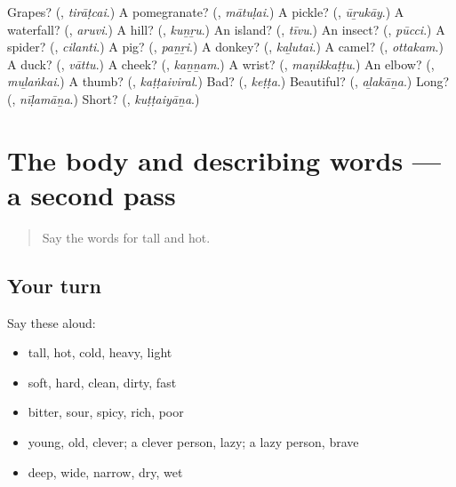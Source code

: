 \begin{tcolorbox}[breakable,colback=teal!4,colframe=teal!35!black,title={Before you move on}]
Grapes? (\textbf{}, \emph{tirāṭcai}.) A pomegranate? (\textbf{}, \emph{mātuḷai}.) A pickle? (\textbf{}, \emph{ūṟukāy}.) A waterfall? (\textbf{}, \emph{aruvi}.) A hill? (\textbf{}, \emph{kuṉṟu}.) An island? (\textbf{}, \emph{tīvu}.) An insect? (\textbf{}, \emph{pūcci}.) A spider? (\textbf{}, \emph{cilanti}.) A pig? (\textbf{}, \emph{paṉṟi}.) A donkey? (\textbf{}, \emph{kaḻutai}.) A camel? (\textbf{}, \emph{ottakam}.) A duck? (\textbf{}, \emph{vāttu}.) A cheek? (\textbf{}, \emph{kaṉṉam}.) A wrist? (\textbf{}, \emph{maṇikkaṭṭu}.) An elbow? (\textbf{}, \emph{muḻaṅkai}.) A thumb? (\textbf{}, \emph{kaṭṭaiviral}.) Bad? (\textbf{}, \emph{keṭṭa}.) Beautiful? (\textbf{}, \emph{aḻakāṉa}.) Long? (\textbf{}, \emph{nīḷamāṉa}.) Short? (\textbf{}, \emph{kuṭṭaiyāṉa}.)
\end{tcolorbox}
\section[(dialogue)]{The body and describing words — a second pass}

\label{lesson:TA-R148-second-pass-the-body-and-describing-words}



\begin{quote}
Say the words for tall and hot.
\end{quote}

\subsection*{Your turn}
Say these aloud:

\begin{itemize}
\raggedright
  \item tall, hot, cold, heavy, light
  \item soft, hard, clean, dirty, fast
  \item bitter, sour, spicy, rich, poor
  \item young, old, clever; a clever person, lazy; a lazy person, brave
  \item deep, wide, narrow, dry, wet
\end{itemize}

